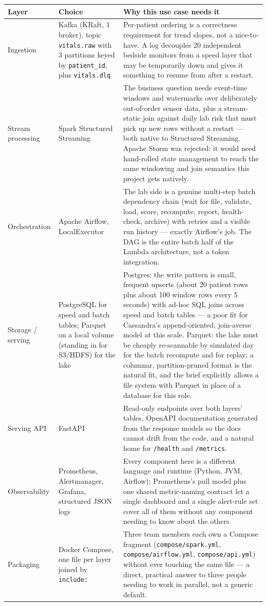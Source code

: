 \documentclass[11pt,a4paper]{article}
\newcommand{\code}[1]{\texttt{\small #1}}
\begin{document}
\begin{longtable}{@{}L{2.6cm}L{4.2cm}L{7.9cm}@{}}
\toprule
\textbf{Layer} & \textbf{Choice} & \textbf{Why this use case needs it} \\
\midrule
\endhead
Ingestion & Kafka (KRaft, 1 broker), topic \code{vitals.raw} with 3 partitions keyed by \code{patient\_id}, plus \code{vitals.dlq} &
Per-patient ordering is a correctness requirement for trend slopes, not a nice-to-have. A log decouples 20 independent bedside monitors from a speed layer that may be temporarily down and gives it something to resume from after a restart. \\
Stream processing & Spark Structured Streaming &
The business question needs event-time windows and watermarks over deliberately out-of-order sensor data, plus a stream-static join against daily lab risk that must pick up new rows without a restart --- both native to Structured Streaming. Apache Storm was rejected: it would need hand-rolled state management to reach the same windowing and join semantics this project gets natively. \\
Orchestration & Apache Airflow, LocalExecutor &
The lab side is a genuine multi-step batch dependency chain (wait for file, validate, load, score, recompute, report, health-check, archive) with retries and a visible run history --- exactly Airflow's job. The DAG is the entire batch half of the Lambda architecture, not a token integration. \\
Storage / serving & PostgreSQL for speed and batch tables; Parquet on a local volume (standing in for S3/HDFS) for the lake &
Postgres: the write pattern is small, frequent upserts (about 20 patient rows plus about 100 window rows every 5 seconds) with ad-hoc SQL joins across speed and batch tables --- a poor fit for Cassandra's append-oriented, join-averse model at this scale. Parquet: the lake must be cheaply re-scannable by simulated day for the batch recompute and for replay; a columnar, partition-pruned format is the natural fit, and the brief explicitly allows a file system with Parquet in place of a database for this role. \\
Serving API & FastAPI &
Read-only endpoints over both layers' tables, OpenAPI documentation generated from the response models so the docs cannot drift from the code, and a natural home for \code{/health} and \code{/metrics}. \\
Observability & Prometheus, Alertmanager, Grafana, structured JSON logs &
Every component here is a different language and runtime (Python, JVM, Airflow); Prometheus's pull model plus one shared metric-naming contract let a single dashboard and a single alert-rule set cover all of them without any component needing to know about the others. \\
Packaging & Docker Compose, one file per layer joined by \code{include:} &
Three team members each own a Compose fragment (\code{compose/spark.yml}, \code{compose/airflow.yml}, \code{compose/api.yml}) without ever touching the same file --- a direct, practical answer to three people needing to work in parallel, not a generic default. \\
\bottomrule
\end{longtable}
\end{document}
